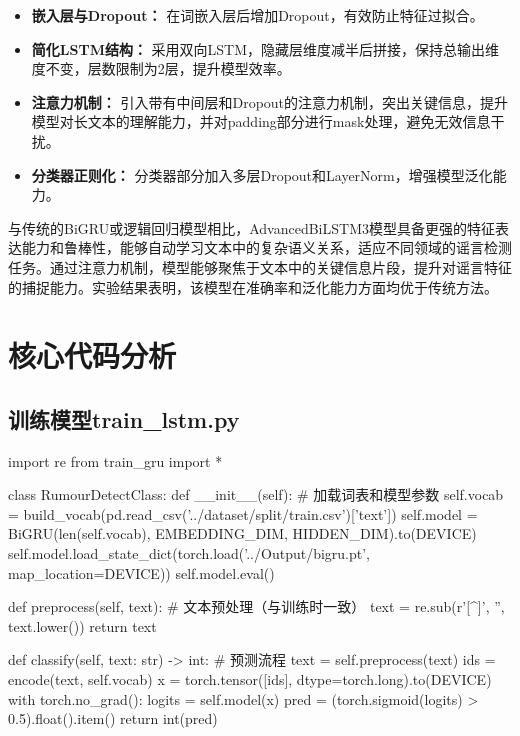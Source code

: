 \begin{itemize}
    \item \textbf{嵌入层与Dropout：} 在词嵌入层后增加Dropout，有效防止特征过拟合。
    \item \textbf{简化LSTM结构：} 采用双向LSTM，隐藏层维度减半后拼接，保持总输出维度不变，层数限制为2层，提升模型效率。
    \item \textbf{注意力机制：} 引入带有中间层和Dropout的注意力机制，突出关键信息，提升模型对长文本的理解能力，并对padding部分进行mask处理，避免无效信息干扰。
    \item \textbf{分类器正则化：} 分类器部分加入多层Dropout和LayerNorm，增强模型泛化能力。
\end{itemize}

与传统的BiGRU或逻辑回归模型相比，AdvancedBiLSTM3模型具备更强的特征表达能力和鲁棒性，能够自动学习文本中的复杂语义关系，适应不同领域的谣言检测任务。通过注意力机制，模型能够聚焦于文本中的关键信息片段，提升对谣言特征的捕捉能力。实验结果表明，该模型在准确率和泛化能力方面均优于传统方法。

\section{核心代码分析}

\subsection{训练模型train\_lstm.py}
\begin{codeblock}[language=Python]
import re
from train_gru import *

class RumourDetectClass:
    def __init__(self):
        # 加载词表和模型参数
        self.vocab = build_vocab(pd.read_csv('../dataset/split/train.csv')['text'])
        self.model = BiGRU(len(self.vocab), EMBEDDING_DIM, HIDDEN_DIM).to(DEVICE)
        self.model.load_state_dict(torch.load('../Output/bigru.pt', map_location=DEVICE))
        self.model.eval()

    def preprocess(self, text):
        # 文本预处理（与训练时一致）
        text = re.sub(r'[^\w\s]', '', text.lower())
        return text
    
    def classify(self, text: str) -> int:
        # 预测流程
        text = self.preprocess(text)
        ids = encode(text, self.vocab)
        x = torch.tensor([ids], dtype=torch.long).to(DEVICE)
        with torch.no_grad():
            logits = self.model(x)
            pred = (torch.sigmoid(logits) > 0.5).float().item()
        return int(pred)
\end{codeblock}


